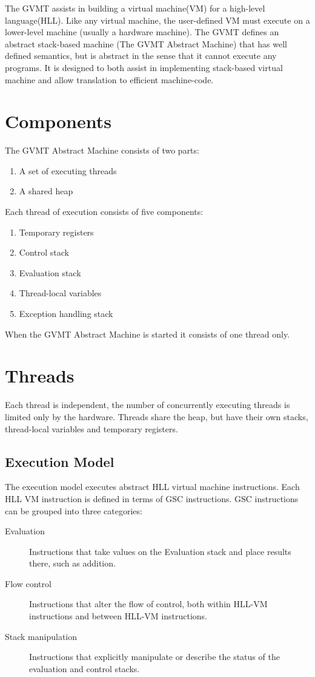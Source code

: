
The GVMT assists in building a virtual machine(VM) for a high-level language(HLL). 
Like any virtual machine, the user-defined VM must execute on a lower-level machine (usually a hardware machine). The GVMT defines an abstract stack-based machine (The GVMT Abstract Machine) that has well defined semantics, but is abstract in the sense that it cannot execute any programs. It is designed to both assist in implementing stack-based virtual machine and allow translation to efficient machine-code.

\section{Components}
The GVMT Abstract Machine consists of two parts:

\begin{enumerate}
\item A set of executing threads
\item A shared heap
\end{enumerate}

Each thread of execution consists of five components:
\begin{enumerate}
\item Temporary registers
\item Control stack
\item Evaluation stack
\item Thread-local variables
\item Exception handling stack
\end{enumerate}

When the GVMT Abstract Machine is started it consists of one thread only.

\section{Threads}
Each thread is independent, the number of concurrently executing threads is limited only by the hardware. Threads share the heap, but have their own stacks, thread-local variables and temporary registers.

\subsection{Execution Model}
The execution model executes abstract HLL virtual machine instructions. Each HLL VM instruction is defined in terms of GSC instructions.
GSC instructions can be grouped into three categories:
\begin{description}
\item[Evaluation] Instructions that take values on the Evaluation stack and place results there, such as addition.
\item[Flow control] Instructions that alter the flow of control, both within HLL-VM instructions and between HLL-VM instructions.
\item[Stack manipulation] Instructions that explicitly manipulate or describe the status of the evaluation and control stacks.
\end{description}

